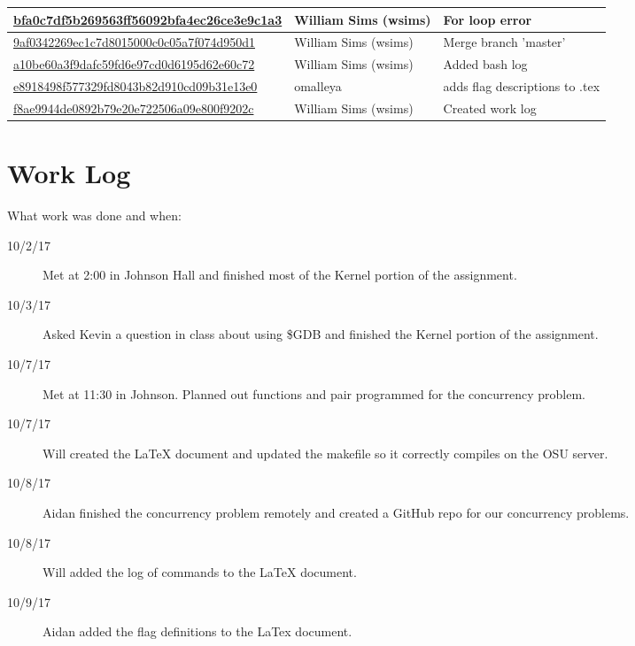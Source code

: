 \documentclass[10pt,letterpaper,draftclsnofoot,onecolumn]{IEEEtran}
\begin{document}
\begin{center}
\begin{tabular}{ | p{8cm} | p{3cm} | p{6cm} |}
    \href{https://github.com/omalleya/cs444-concurrency-writeups/commit/bfa0c7df5b269563ff56092bfa4ec26ce3e9c1a3}{bfa0c7df5b269563ff56092bfa4ec26ce3e9c1a3} & William Sims (wsims) & For loop error \\ \hline
    \href{https://github.com/omalleya/cs444-concurrency-writeups/commit/9af0342269ec1c7d8015000c0c05a7f074d950d1}{9af0342269ec1c7d8015000c0c05a7f074d950d1} & William Sims (wsims) & Merge branch 'master' \\ \hline
    \href{https://github.com/omalleya/cs444-concurrency-writeups/commit/a10be60a3f9dafc59fd6e97cd0d6195d62e60c72}{a10be60a3f9dafc59fd6e97cd0d6195d62e60c72} & William Sims (wsims) & Added bash log \\ \hline
    \href{https://github.com/omalleya/cs444-concurrency-writeups/commit/e8918498f577329fd8043b82d910cd09b31e13e0}{e8918498f577329fd8043b82d910cd09b31e13e0} & omalleya & adds flag descriptions to .tex \\ \hline
    \href{https://github.com/omalleya/cs444-concurrency-writeups/commit/f8ae9944de0892b79e20e722506a09e800f9202c}{f8ae9944de0892b79e20e722506a09e800f9202c} & William Sims (wsims) & Created work log \\ \hline
    \end{tabular}
\end{center}

\section{Work Log}
\noindent What work was done and when:
\begin{description}
\item [10/2/17] Met at 2:00 in Johnson Hall and finished most of the Kernel portion of the assignment.
\item [10/3/17] Asked Kevin a question in class about using \$GDB and finished the Kernel portion of the assignment. 
\item [10/7/17] Met at 11:30 in Johnson. Planned out functions and pair programmed for the concurrency problem.
\item [10/7/17] Will created the LaTeX document and updated the makefile so it correctly compiles on the OSU server. 
\item [10/8/17] Aidan finished the concurrency problem remotely and created a GitHub repo for our concurrency problems. 
\item [10/8/17] Will added the log of commands to the LaTeX document. 
\item [10/9/17] Aidan added the flag definitions to the LaTex document. 
\end{description}



\end{document}
